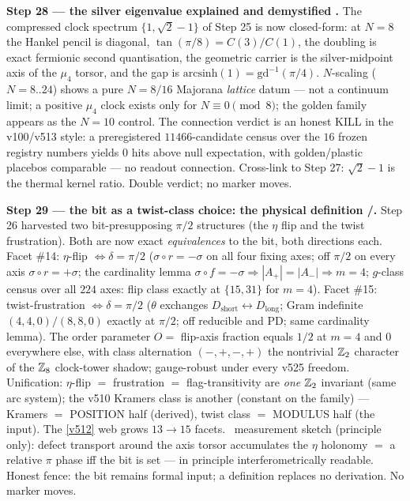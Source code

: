 \par\smallskip\noindent\textbf{Step 28 --- the silver eigenvalue explained and demystified
\mE.} The compressed clock spectrum $\{1,\sqrt2-1\}$ of Step 25 is now closed-form: at
$N=8$ the Hankel pencil is diagonal, $\tan(\pi/8)=C(3)/C(1)$, the doubling is exact
fermionic second quantisation, the geometric carrier is the silver-midpoint axis of the
$\mu_4$ torsor, and the gap is $\mathrm{arcsinh}(1)=\mathrm{gd}^{-1}(\pi/4)$. $N$-scaling
($N=8..24$) shows a pure $N=8/16$ Majorana \emph{lattice} datum --- not a continuum
limit; a positive $\mu_4$ clock exists only for $N\equiv0\pmod8$; the golden family
appears as the $N=10$ control. The connection verdict is an honest KILL in the
v100/v513 style: a preregistered $11466$-candidate census over the $16$ frozen registry
numbers yields $0$ hits above null expectation, with golden/plastic placebos comparable
--- no readout connection. Cross-link to Step 27: $\sqrt2-1$ is the thermal kernel
ratio. Double verdict; no marker moves.

\par\smallskip\noindent\textbf{Step 29 --- the bit as a twist-class choice: the physical
definition \mE/\mC.} Step 26 harvested two bit-presupposing $\pi/2$ structures (the
$\eta$ flip and the twist frustration). Both are now exact \emph{equivalences} to the
bit, both directions each. Facet \#14: $\eta$-flip $\Leftrightarrow\delta=\pi/2$
($\sigma\circ r=-\sigma$ on all four fixing axes; off $\pi/2$ on every axis
$\sigma\circ r=+\sigma$; the cardinality lemma $\sigma\circ f=-\sigma\Rightarrow
|A_+|=|A_-|\Rightarrow m=4$; $g$-class census over all $224$ axes: flip class exactly at
$\{15,31\}$ for $m=4$). Facet \#15: twist-frustration $\Leftrightarrow\delta=\pi/2$
($\theta$ exchanges $D_{\mathrm{short}}\leftrightarrow D_{\mathrm{long}}$; Gram
indefinite $(4,4,0)/(8,8,0)$ exactly at $\pi/2$; off reducible and PD; same cardinality
lemma). The order parameter $O=$ flip-axis fraction equals $1/2$ at $m=4$ and $0$
everywhere else, with class alternation $(-,+,-,+)$ the nontrivial $\mathbb{Z}_2$ character of
the $\mathbb{Z}_8$ clock-tower shadow; gauge-robust under every v525 freedom. Unification:
$\eta$-flip $=$ frustration $=$ flag-transitivity are \emph{one} $\mathbb{Z}_2$ invariant (same
arc system); the v510 Kramers class is another (constant on the family) --- Kramers $=$
POSITION half (derived), twist class $=$ MODULUS half (the input). The \vref{v512} web
grows $13\to15$ facets. \mC\ measurement sketch (principle only): defect transport around
the axis torsor accumulates the $\eta$ holonomy $=$ a relative $\pi$ phase iff the bit is
set --- in principle interferometrically readable. Honest fence: the bit remains formal
input; a definition replaces no derivation. No marker moves.

